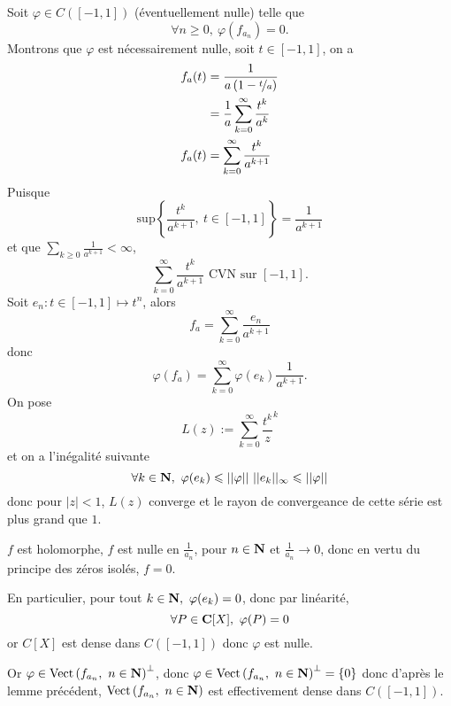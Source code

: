 \documentclass[a4paper,11pt, twoside]{article}
\begin{document}
\begin{Proof}
  Soit $\varphi\in C([-1,1])$ (éventuellement nulle) telle que 
  $$\forall n\geqslant 0,\ \varphi(f_{a_n})=0.$$
  Montrons que $\varphi$ est nécessairement nulle, soit $t\in[-1,1]$, on a 
  \begin{align*}
    f_a(t)&=\frac{1}{a\left(1-\nicefrac{t}{a}\right)}\\
    &=\frac{1}{a}\sum_{k=0}^\infty\frac{t^k}{a^k}\\
    f_a(t)&=\sum_{k=0}^\infty\frac{t^k}{a^{k+1}}
  \end{align*}
  Puisque 
  $$\mathrm{sup}\left\{\frac{t^k}{a^{k+1}},\ t\in[-1,1]\right\}=\frac{1}{a^{k+1}}$$
  et que $\sum_{k\geqslant 0}\frac{1}{a^{k+1}}<\infty$,
  $$\sum_{k=0}^\infty\frac{t^k}{a^{k+1}}\text{ CVN sur }[-1,1].$$
  Soit $e_n:t\in[-1,1]\longmapsto t^n$, alors 
  $$f_a=\sum_{k=0}^\infty\frac{e_n}{a^{k+1}}$$
  donc
  $$\varphi(f_a)=\sum_{k=0}^\infty\varphi(e_k)\frac{1}{a^{k+1}}.$$
  On pose 
  $$L(z):=\sum_{k=0}^\infty\frac{t^k}z^k$$
  et on a l'inégalité suivante 
  $$\forall k\in\mathbf N,\ \varphi(e_k)\leqslant ||\varphi||\ ||e_k||_\infty\leqslant ||\varphi||$$
  donc pour $|z|<1$, $L(z)$ converge et le rayon de convergeance de cette série est plus grand que $1$.

  $f$ est holomorphe, $f$ est nulle en $\frac{1}{a_n}$, pour $n\in\mathbf N$ et $\frac{1}{a_n}\longrightarrow 0$, donc en vertu du principe des zéros isolés, $f=0$.

  En particulier, pour tout $k\in \N,\ \varphi(e_k)=0$, donc par linéarité, 
  $$\forall P\in \mathbf C[X],\ \varphi(P)=0$$
  or $C[X]$ est dense dans $C([-1,1])$ donc $\varphi$ est nulle.

  Or $\varphi\in \mathrm{Vect}\left(f_{a_n},\ n\in\N\right)^\bot$, donc $\varphi\in \mathrm{Vect}\left(f_{a_n},\ n\in\mathbf N\right)^\bot=\{0\}$ donc d'après le lemme précédent, $\mathrm{Vect}\left(f_{a_n},\ n\in\mathbf N\right)$ est effectivement dense dans $C([-1,1])$.
\end{Proof}


\setcounter{prop}{0}




\end{document}
